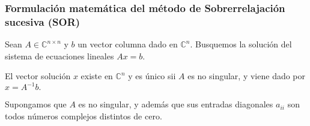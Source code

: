 \begin{frame}
	\frametitle{Formulación matemática del método de Sobrerrelajación sucesiva (SOR)}
	Sean $A\in\mathbb{C}^{n\times n}$ y $b$ un vector columna dado en
	$\mathbb{C}^{n}$.
	Busquemos la solución del sistema de ecuaciones lineales
	\begin{math}
		Ax=b.
	\end{math}

	El vector solución $x$ existe en $\mathbb{C}^{n}$ y es único sii
	$A$ es no singular, y viene dado por
	\begin{math}
		x=A^{-1}b.
	\end{math}

	Supongamos que $A$ es no singular, y además que sus entradas
	diagonales $a_{ii}$ son todos números complejos distintos de cero.


\end{frame}
